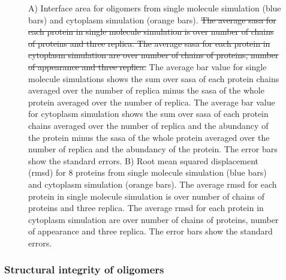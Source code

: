 \documentclass[journal=jacsat,manuscript=article]{achemso}
\begin{document}
\begin{figure}[H]
\caption{A) Interface area for oligomers from single molecule simulation (blue bars) and cytoplasm simulation (orange bars). \st{The average sasa for each protein in single molecule simulation is over number of chains of proteins and three replica. The average sasa for each protein in cytoplasm simulation are over number of chains of proteins, number of appearance and three replica.} The average bar value for single molecule simulations shows the sum over sasa of each protein chains averaged over the number of replica minus the sasa of the whole protein averaged over the number of replica. The average bar value for cytoplasm simulation shows the sum over sasa of each protein chains averaged over the number of replica and the abundancy of the protein minus the sasa of the whole protein averaged over the number of replica and the abundancy of the protein. The error bars show the standard errors. B) Root mean squared displacement (rmsd) for 8 proteins from single molecule simulation (blue bars) and cytoplasm simulation (orange bars). The average rmsd for each protein in single molecule simulation is over number of chains of proteins and three replica. The average rmsd for each protein in cytoplasm simulation are over number of chains of proteins, number of appearance and three replica. The error bars show the standard errors.}
\label{fig:structural_integrity_chain}
\end{figure}



\subsubsection{Structural integrity of oligomers}


\end{document}
